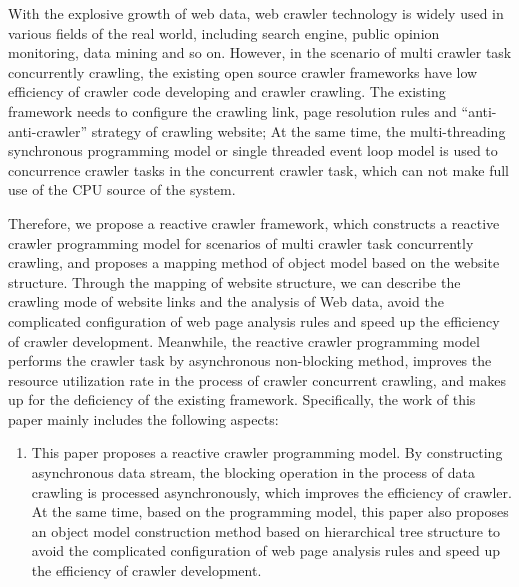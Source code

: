 \documentclass[master]{njuthesis}
\begin{document}
\begin{englishabstract}
With the explosive growth of web data, web crawler technology is widely used in various fields of the real world, including search engine, public opinion monitoring, data mining and so on. However, in the scenario of multi crawler task concurrently crawling, the existing open source crawler frameworks have low efficiency of crawler code developing and crawler crawling. The existing framework needs to configure the crawling link, page resolution rules and “anti-anti-crawler” strategy of crawling website; At the same time, the multi-threading synchronous programming model or single threaded event loop model is used to concurrence crawler tasks in the concurrent crawler task, which can not make full use of the CPU source of the system. 

Therefore, we propose a reactive crawler framework, which constructs a reactive crawler programming model for scenarios of multi crawler task concurrently crawling, and proposes a mapping method of object model based on the website structure. Through the mapping of website structure, we can describe the crawling mode of website links and the analysis of Web data, avoid the complicated configuration of web page analysis rules and speed up the efficiency of crawler development. Meanwhile, the reactive crawler programming model performs the crawler task by asynchronous non-blocking method, improves the resource utilization rate in the process of crawler concurrent crawling, and makes up for the deficiency of the existing framework. Specifically, the
work of this paper mainly includes the following aspects: 
\begin{enumerate}

\item This paper proposes a reactive crawler programming model. By constructing asynchronous data stream, the blocking operation in the process of data crawling is processed asynchronously, which improves the efficiency of crawler.
At the same time, based on the programming model, this paper also proposes an object model construction method based on hierarchical tree structure to avoid the complicated configuration of web page analysis rules and speed up the efficiency of crawler development.


\end{enumerate}
\end{englishabstract}
\end{document}
